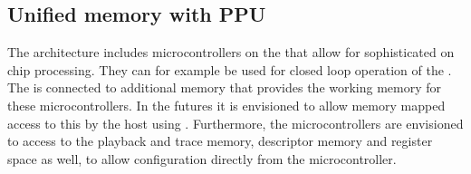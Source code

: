 \subsection{Unified memory with PPU}
The \BSSTwo{} architecture includes microcontrollers on the \ASIC{} that allow for sophisticated on chip processing. They can for example be used for closed loop operation of the \ASIC{}. The \FPGA{} is connected to additional \DDR{} memory that provides the working memory for these microcontrollers. In the futures it is envisioned to allow memory mapped access to this \DDR{} by the host using \FAXI{}. Furthermore, the microcontrollers are envisioned to access to the playback and trace memory, descriptor memory and \AXIDMA{} register space as well, to allow configuration directly from the microcontroller.
